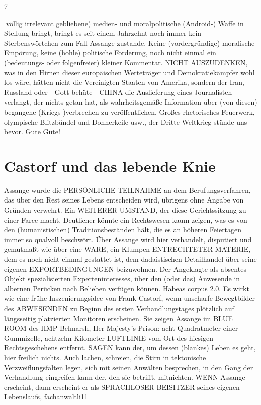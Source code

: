 \begin{multicols}{2}
7

völlig irrelevant gebliebene) medien- und moralpolitische (Android-) Waffe in Stellung bringt, bringt es seit
einem Jahrzehnt noch immer kein Sterbenswörtchen
zum Fall Assange zustande. Keine (vordergründige) moralische Empörung, keine (hohle) politische Forderung,
noch nicht einmal ein (bedeutungs- oder folgenfreier)
kleiner Kommentar.
NICHT AUSZUDENKEN, was in den Hirnen dieser europäischen Werteträger und Demokratiekämpfer wohl los
wäre, hätten nicht die Vereinigten Staaten von Amerika,
sondern der Iran, Russland oder - Gott behüte - CHINA
die Auslieferung eines Journalisten verlangt, der nichts
getan hat, als wahrheitsgemäße Information über (von
diesen) begangene (Kriegs-)verbrechen zu veröffentlichen. Großes rhetorisches Feuerwerk, olympische Blitzbündel und Donnerkeile usw., der Dritte Weltkrieg stünde uns bevor. Gute Güte!


\chapter{Castorf und das lebende Knie}

Assange wurde die PERSÖNLICHE TEILNAHME an dem
Berufungsverfahren, das über den Rest seines Lebens
entscheiden wird, übrigens ohne Angabe von Gründen
verwehrt. Ein WEITERER UMSTAND, der diese Gerichtssitzung zu einer Farce macht. Deutlicher könnte ein
Rechtswesen kaum zeigen, was es von den (humanistischen) Traditionsbeständen hält, die es an höheren Feiertagen immer so qualvoll beschwört.
Über Assange wird hier verhandelt, disputiert und gemutmaßt wie über eine WARE, ein Klumpen ENTRECHTETER MATERIE, dem es noch nicht einmal gestattet
ist, dem dadaistischen Detailhandel über seine eigenen
EXPORTBEDINGUNGEN beizuwohnen. Der Angeklagte
als absentes Objekt spezialisierten Experteninteresses,
über den (oder das) Anwesende in albernen Perücken
nach Belieben verfügen können. Habeas corpus 2.0.
Es wirkt wie eine frühe Inszenierungsidee von Frank
Castorf, wenn unscharfe Bewegtbilder des ABWESENDEN zu Beginn des ersten Verhandlungstages plötzlich
auf längsseitig platzierten Monitoren erscheinen. Sie
zeigen Assange im BLUE ROOM des HMP Belmarsh, Her
Majesty’s Prison: acht Quadratmeter einer Gummizelle,
achtzehn Kilometer LUFTLINIE vom Ort des hiesigen
Rechtsgeschehens entfernt.
SAGEN kann der, um dessen (blankes) Leben es geht,
hier freilich nichts. Auch lachen, schreien, die Stirn in
tektonische Verzweiflungsfalten legen, sich mit seinen
Anwälten besprechen, in den Gang der Verhandlung
eingreifen kann der, den sie betrifft, mitnichten. WENN
Assange erscheint, dann erscheint er als SPRACHLOSER
BEISITZER seines eigenen Lebenslaufs, fachanwaltli11


\end{multicols}
